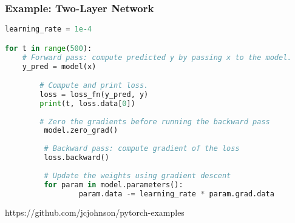 \begin{frame}[fragile]
\MyLogo
\frametitle{Example: Two-Layer Network}  

\ContinueLineNumber
\begin{lstlisting}[language=python]
learning_rate = 1e-4

for t in range(500):
	# Forward pass: compute predicted y by passing x to the model.
	y_pred = model(x)

        # Compute and print loss.
        loss = loss_fn(y_pred, y)
        print(t, loss.data[0])
        
        # Zero the gradients before running the backward pass
         model.zero_grad()
         
         # Backward pass: compute gradient of the loss
         loss.backward()
         
         # Update the weights using gradient descent
         for param in model.parameters():
                 param.data -= learning_rate * param.grad.data
\end{lstlisting}

\begin{center}
{\color{red}\scriptsize
https://github.com/jcjohnson/pytorch-examples
}
\end{center}

\end{frame}
